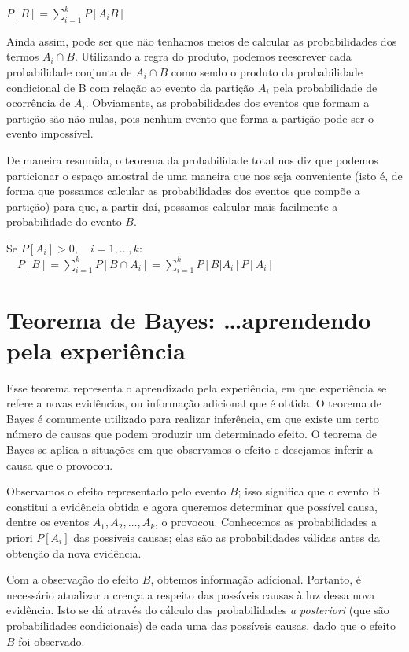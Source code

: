 \documentclass[
]{book}
\theoremstyle{definition}
\theoremstyle{definition}
\theoremstyle{definition}
\theoremstyle{remark}
\begin{document}
\(P[B] = \sum_{i=1}^{k} P[A_iB]\)

Ainda assim, pode ser que não tenhamos meios de calcular as probabilidades dos termos \(A_i\cap B\). Utilizando a regra do produto, podemos reescrever cada probabilidade conjunta de \(A_i\cap B\) como sendo o produto da probabilidade condicional de B com relação ao evento da partição \(A_i\) pela probabilidade de ocorrência de \(A_i\). Obviamente, as probabilidades dos eventos que formam a partição são não nulas, pois nenhum evento que forma a partição pode ser o evento impossível.

De maneira resumida, o teorema da probabilidade total nos diz que podemos particionar o espaço amostral de uma maneira que nos seja conveniente (isto é, de forma que possamos calcular as probabilidades dos eventos que compõe a partição) para que, a partir daí, possamos calcular mais facilmente a probabilidade do evento \(B\).

Se \(P[A_i] >0, \quad i= 1, \ldots, k\):
\(\quad P[B] = \sum_{i=1}^{k} P [B\cap A_i] = \sum_{i=1}^{k} P[B|A_i] P[A_i]\)

\hypertarget{teorema-de-bayes-aprendendo-pela-experiuxeancia}{%
\section{Teorema de Bayes: \ldots aprendendo pela experiência}\label{teorema-de-bayes-aprendendo-pela-experiuxeancia}}

Esse teorema representa o aprendizado pela experiência, em que experiência se refere a novas evidências, ou informação adicional que é obtida. O teorema de Bayes é comumente utilizado para realizar inferência, em que existe um certo número de causas que podem produzir um determinado efeito. O teorema de Bayes se aplica a situações em que observamos o efeito e desejamos inferir a causa que o provocou.

Observamos o efeito representado pelo evento \(B\); isso significa que o evento B constitui a evidência obtida e agora queremos determinar que possível causa, dentre os eventos \(A_1, A_2, \ldots, A_k\), o provocou. Conhecemos as probabilidades a priori \(P[A_i]\) das possíveis causas; elas são as probabilidades válidas antes da obtenção da nova evidência.

Com a observação do efeito \(B\), obtemos informação adicional. Portanto, é necessário atualizar a crença a respeito das possíveis causas à luz dessa nova evidência. Isto se dá através do cálculo das probabilidades \emph{a posteriori} (que são probabilidades condicionais) de cada uma das possíveis causas, dado que o efeito \(B\) foi observado.
\end{document}
